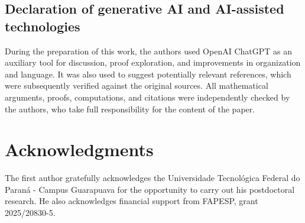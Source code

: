 \documentclass[reqno,12pt]{amsart}
\theoremstyle{plain}
\theoremstyle{definition}
\theoremstyle{remark}
\numberwithin{equation}{section}
\begin{document}
\subsection*{Declaration of generative AI and AI-assisted technologies}

During the preparation of this work, the authors used OpenAI
ChatGPT as an auxiliary tool for discussion, proof
exploration, and improvements in organization and language. It was also
used to suggest potentially relevant references, which were subsequently
verified against the original sources. All mathematical arguments,
proofs, computations, and citations were independently checked by the
authors, who take full responsibility for the content of the paper.


\section{Acknowledgments}
The first author gratefully acknowledges the Universidade Tecnol\'ogica
Federal do Paran\'a - Campus Guarapuava for the opportunity to carry out his postdoctoral
research. He also acknowledges financial support from FAPESP, grant
2025/20830-5.
\end{document}
